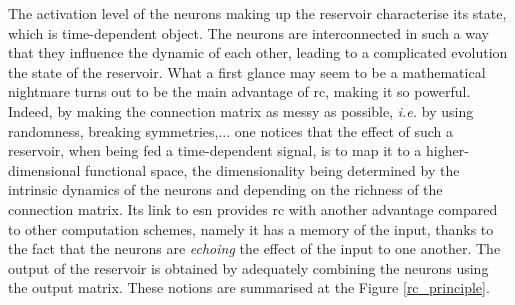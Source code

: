 The activation level of the neurons making up the reservoir characterise its state, which is time-dependent object. The neurons are interconnected in such a way that they influence the dynamic of each other, leading to a complicated evolution the state of the reservoir. What a first glance may seem to be a mathematical nightmare turns out to be the main advantage of \gls{rc}, making it so powerful. Indeed, by making the connection matrix as messy as possible, \textit{i.e.} by using randomness, breaking symmetries,... one notices that the effect of such a reservoir, when being fed a time-dependent signal, is to map it to a higher-dimensional functional space, the dimensionality being determined by the intrinsic dynamics of the neurons and depending on the richness of the connection matrix. Its link to \gls{esn} provides  \gls{rc} with another advantage compared to other computation schemes,  namely it has a memory of the input, thanks to the fact that the neurons are \textit{echoing} the effect of the input to one another. The output of the reservoir is obtained by adequately combining the neurons using the output matrix. These notions are summarised at the Figure \ref{rc_principle}.\\


